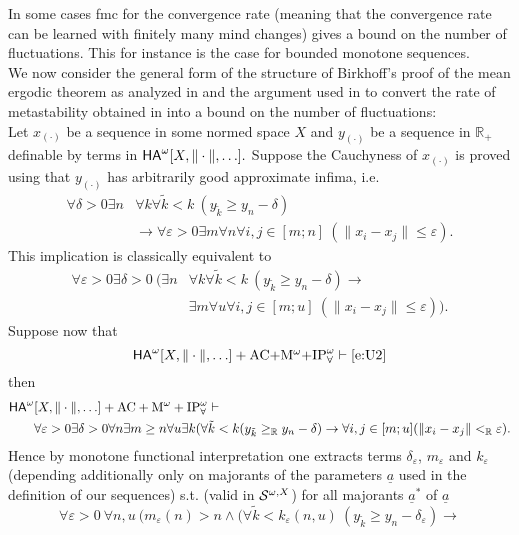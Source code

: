 \documentclass[1p]{elsarticle}
\newcommand{\usftext}[1]{\textsf{\upshape #1}}
\newcommand{\RR}{\ensuremath{\mathbb{R}}}
\newcommand{\ha}{\ensuremath{{\usftext{HA}}^\omega}} %
\theoremstyle{plain}
\theoremstyle{definition}
\theoremstyle{remark}
\renewcommand{\epsilon}{\varepsilon}
\theoremstyle{definition}
\begin{document}
{In some cases fmc for the convergence rate (meaning that the convergence rate can be learned with finitely many mind changes) gives a bound on the number of fluctuations. This for instance is the case for bounded monotone sequences.
\\[2mm] 
We now consider the general form of the structure of Birkhoff's proof 
of the mean ergodic theorem as analyzed in \cite{Kohlenbach/Leustean4} and 
the argument used in \cite{Avigad/Rute} to convert the rate of metastability 
obtained in \cite{Kohlenbach/Leustean4} into a bound on the number of 
fluctuations: \\[1mm]
Let $x_{(\cdot)}$ be a sequence in some normed space $X$ and $y_{(\cdot)}$ be a sequence in $\RR_+$ definable by terms in $\ha[X,\|\cdot\|,\ldots].$ 
Suppose the Cauchyness of $x_{(\cdot)}$ 
is proved using that $y_{(\cdot)}$ has arbitrarily good approximate 
infima, i.e.
\begin{align}
\forall \delta>0\exists n &\forall k \forall \tilde k< k\ (y_{\tilde k}\geq y_n-\delta)\\
&\rightarrow \forall \epsilon>0\exists m \forall n \forall i,j\in[m;n]\ (\|x_i-x_j\|\leq \epsilon).
\end{align}
This implication is classically equivalent to 
\begin{align*}
\forall \epsilon>0 \exists \delta>0\ \Big( \exists n &\forall k \forall \tilde k< k\ (y_{\tilde k}\geq y_n-\delta)\rightarrow \\ \tag{+}\label{e:U2}
&\exists m \forall u \forall i,j\in[m;u]\ (\|x_i-x_j\|\leq \epsilon) \Big).
\end{align*}
Suppose now that 
\[
\ha[X,\|\cdot\|,\ldots]+\mbox{AC$+$M$^{\omega}+$IP}^{\omega}_{\forall} 
\vdash\text{\eqref{e:U2}}
\]
then
\begin{align*}
\ha&[X,\|\cdot\|,\ldots]+{\rm AC}+{\rm M}^{\omega} +{\rm IP}^\omega_\forall \vdash\\
&\forall\epsilon>0\exists\delta>0\forall n\exists m\geq n\forall u\exists k(\forall \tilde k<k(y_{\tilde k}\geq_\RR y_n-\delta)
\rightarrow \forall i,j\in[m;u](\|x_i-x_j\|<_\RR\epsilon).
\end{align*}
Hence by monotone functional interpretation one extracts terms 
 $\delta_\epsilon$, $m_\epsilon$ and $k_\epsilon$ (depending additionally only on majorants of the parameters $\underline{a}$ used in the definition of 
our sequences) s.t. (valid in 
${\cal S}^{\omega,X}$) for all majorants $\underline{a}^*$ of $\underline{a}$ 
\[
\forall \epsilon>0\ \forall n,u\ \bigg( m_\epsilon(n)>n \wedge \Big(\forall \tilde k< k_\epsilon(n,u)\ (y_{\tilde k}\geq y_n-\delta_\epsilon)\rightarrow 
\]}
\end{document}
